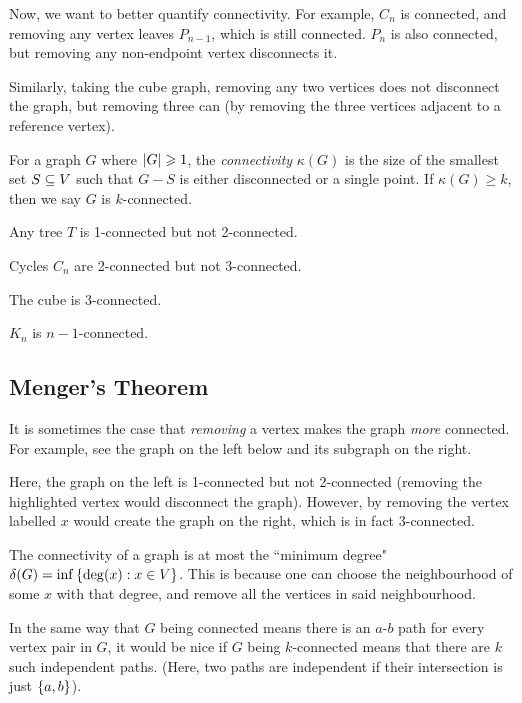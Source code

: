 \documentclass{article}
\begin{document}
Now, we want to better quantify connectivity. For example, $C_n$ is connected, and removing any vertex leaves $P_{n-1}$, which is still connected. $P_n$ is also connected, but removing any non-endpoint vertex disconnects it.

Similarly, taking the cube graph, removing any two vertices does not disconnect the graph, but removing three can (by removing the three vertices adjacent to a reference vertex).

\begin{definition}[Connectivity]
    For a graph $G$ where $\left\lvert G \right\rvert \geqslant 1$, the \textit{connectivity} $\kappa(G)$ is the size of the smallest set $S \subseteq V$ such that $G-S$ is either disconnected or a single point. If $\kappa(G) \geq k$, then we say $G$ is $k$-connected.
\end{definition}

\begin{example}[Connectivity]
    Any tree $T$ is 1-connected but not 2-connected.
    
    Cycles $C_n$ are 2-connected but not 3-connected.
    
    The cube is 3-connected.
    
    $K_n$ is $n-1$-connected.
\end{example}


\subsection{Menger's Theorem}

It is sometimes the case that \textit{removing} a vertex makes the graph \textit{more} connected. For example, see the graph on the left below and its subgraph on the right.


Here, the graph on the left is 1-connected but not 2-connected (removing the highlighted vertex would disconnect the graph). However, by removing the vertex labelled $x$ would create the graph on the right, which is in fact 3-connected.

The connectivity of a graph is at most the ``minimum degree" $\delta(G) = \inf \left\lbrace \deg(x): x \in V \right\rbrace$. This is because one can choose the neighbourhood of some $x$ with that degree, and remove all the vertices in said neighbourhood.

In the same way that $G$ being connected means there is an $a$-$b$ path for every vertex pair in $G$, it would be nice if $G$ being $k$-connected means that there are $k$ such independent paths. (Here, two paths are independent if their intersection is just $\left\lbrace a, b \right\rbrace$).
\end{document}
